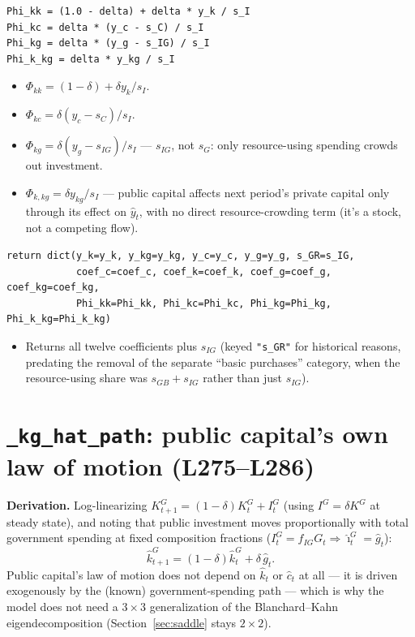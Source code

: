 \documentclass[11pt]{article}
\newcommand{\eq}[1]{\begin{equation}#1\end{equation}}
\begin{document}
\begin{lstlisting}[firstnumber=265]
Phi_kk = (1.0 - delta) + delta * y_k / s_I
Phi_kc = delta * (y_c - s_C) / s_I
Phi_kg = delta * (y_g - s_IG) / s_I
Phi_k_kg = delta * y_kg / s_I
\end{lstlisting}
\begin{itemize}
\item[\textbf{L265}] $\Phi_{kk}=(1-\delta)+\delta y_k/s_I$.
\item[\textbf{L266}] $\Phi_{kc}=\delta(y_c-s_C)/s_I$.
\item[\textbf{L267}] $\Phi_{kg}=\delta(y_g-s_{IG})/s_I$ --- $s_{IG}$, not
$s_G$: only resource-using spending crowds out investment.
\item[\textbf{L268}] $\Phi_{k,kg}=\delta y_{kg}/s_I$ --- public capital
affects next period's private capital only through its effect on $\hat
y_t$, with no direct resource-crowding term (it's a stock, not a
competing flow).
\end{itemize}

\begin{lstlisting}[firstnumber=270]
return dict(y_k=y_k, y_kg=y_kg, y_c=y_c, y_g=y_g, s_GR=s_IG,
            coef_c=coef_c, coef_k=coef_k, coef_g=coef_g, coef_kg=coef_kg,
            Phi_kk=Phi_kk, Phi_kc=Phi_kc, Phi_kg=Phi_kg, Phi_k_kg=Phi_k_kg)
\end{lstlisting}
\begin{itemize}
\item[\textbf{L270--L271}] Returns all twelve coefficients plus $s_{IG}$
(keyed \texttt{"s\_GR"} for historical reasons, predating the removal of
the separate ``basic purchases'' category, when the resource-using share
was $s_{GB}+s_{IG}$ rather than just $s_{IG}$).
\end{itemize}

\section{\texttt{\_kg\_hat\_path}: public capital's own law of motion (L275--L286)}
\label{sec:kghat}

\textbf{Derivation.} Log-linearizing $K^G_{t+1}=(1-\delta)K^G_t+I^G_t$
(using $I^G=\delta K^G$ at steady state), and noting that public investment
moves proportionally with total government spending at fixed composition
fractions ($I^G_t=f_{IG}G_t\Rightarrow\hat\imath^G_t=\hat g_t$):
\eq{ \hat k^G_{t+1} = (1-\delta)\hat k^G_t+\delta\,\hat g_t. \label{eq:kg-law} }
Public capital's law of motion does not depend on $\hat k_t$ or $\hat c_t$
at all --- it is driven exogenously by the (known) government-spending path
--- which is why the model does not need a $3\times3$ generalization of the
Blanchard--Kahn eigendecomposition (Section~\ref{sec:saddle} stays
$2\times2$).
\end{document}
